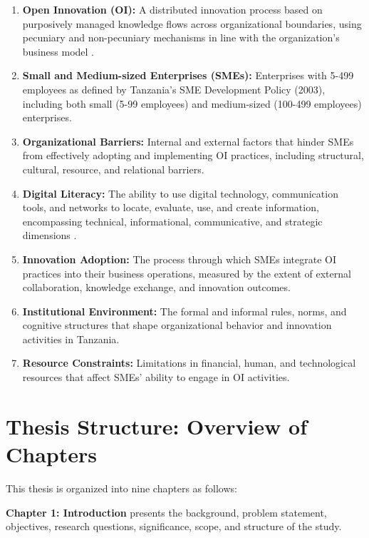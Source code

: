 \begin{enumerate}
    \item \textbf{Open Innovation (OI):} A distributed innovation process based on purposively managed knowledge flows across organizational boundaries, using pecuniary and non-pecuniary mechanisms in line with the organization's business model \citep{chesbrough2014new}.

    \item \textbf{Small and Medium-sized Enterprises (SMEs):} Enterprises with 5-499 employees as defined by Tanzania's SME Development Policy (2003), including both small (5-99 employees) and medium-sized (100-499 employees) enterprises.

    \item \textbf{Organizational Barriers:} Internal and external factors that hinder SMEs from effectively adopting and implementing OI practices, including structural, cultural, resource, and relational barriers.

    \item \textbf{Digital Literacy:} The ability to use digital technology, communication tools, and networks to locate, evaluate, use, and create information, encompassing technical, informational, communicative, and strategic dimensions \citep{eshet2004digital}.

    \item \textbf{Innovation Adoption:} The process through which SMEs integrate OI practices into their business operations, measured by the extent of external collaboration, knowledge exchange, and innovation outcomes.

    \item \textbf{Institutional Environment:} The formal and informal rules, norms, and cognitive structures that shape organizational behavior and innovation activities in Tanzania.

    \item \textbf{Resource Constraints:} Limitations in financial, human, and technological resources that affect SMEs' ability to engage in OI activities.
\end{enumerate}

\section{Thesis Structure: Overview of Chapters}

This thesis is organized into nine chapters as follows:

\textbf{Chapter 1: Introduction} presents the background, problem statement, objectives, research questions, significance, scope, and structure of the study.

